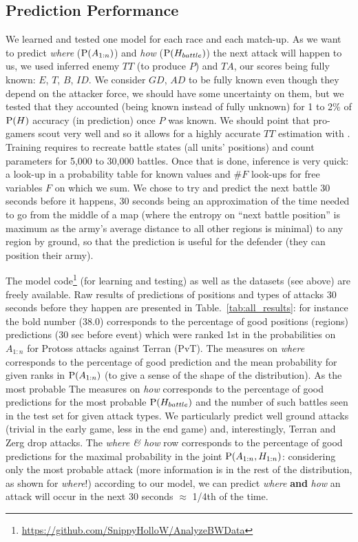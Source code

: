 \subsection{Prediction Performance}
We learned and tested one model for each race and each match-up. As we want to predict \textit{where} ($\mathrm{P}(A_{1:n})$) and \textit{how} ($\mathrm{P}(H_{battle})$) the next attack will happen to us, we used inferred enemy $TT$ (to produce $P$) and $TA$, our scores being fully known: $E$, $T$, $B$, $ID$. We consider $GD$, $AD$ to be fully known even though they depend on the attacker force, we should have some uncertainty on them, but we tested that they accounted (being known instead of fully unknown) for 1 to 2\% of $\mathrm{P}(H)$ accuracy (in prediction) once $P$ was known. We should point that pro-gamers scout very well and so it allows for a highly accurate $TT$ estimation with \cite{SYNNAEVE:StratPred}. Training requires to recreate battle states (all units' positions) and count parameters for 5,000 to 30,000 battles. Once that is done, inference is very quick: a look-up in a probability table for known values and $\#F$ look-ups for free variables $F$ on which we sum. We chose to try and predict the next battle 30 seconds before it happens, 30 seconds being an approximation of the time needed to go from the middle of a map (where the entropy on ``next battle position'' is maximum as the army's average distance to all other regions is minimal) to any region by ground, so that the prediction is useful for the defender (they can position their army).

The model code\footnote{\url{https://github.com/SnippyHolloW/AnalyzeBWData}} (for learning and testing) as well as the datasets (see above) are freely available. Raw results of predictions of positions and types of attacks 30 seconds before they happen are presented in Table.~\ref{tab:all_results}: for instance the bold number (38.0) corresponds to the percentage of good positions (regions) predictions (30 sec before event) which were ranked 1st in the probabilities on $A_{1:n}$ for Protoss attacks against Terran (PvT). The measures on \textit{where} corresponds to the percentage of good prediction and the mean probability for given ranks in $\mathrm{P}(A_{1:n})$ (to give a sense of the shape of the distribution). As the most probable The measures on \textit{how} corresponds to the percentage of good predictions for the most probable $\mathrm{P}(H_{battle})$ and the number of such battles seen in the test set for given attack types. We particularly predict well ground attacks (trivial in the early game, less in the end game) and, interestingly, Terran and Zerg drop attacks. The \textit{where \& how} row corresponds to the percentage of good predictions for the maximal probability in the joint $\mathrm{P}(A_{1:n},H_{1:n})$: considering only the most probable attack (more information is in the rest of the distribution, as shown for \textit{where}!) according to our model, we can predict \textit{where} \textbf{and} \textit{how} an attack will occur in the next 30 seconds $\approx$ 1/4th of the time. 


